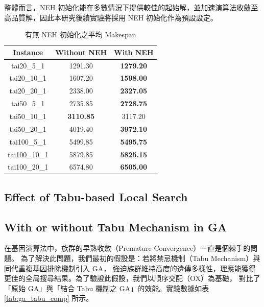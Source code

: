 \documentclass[conference]{IEEEtran}
\begin{document}
整體而言，NEH 初始化能在多數情況下提供較佳的起始解，並加速演算法收斂至高品質解，因此本研究後續實驗將採用 NEH 初始化作為預設設定。
\begin{table}[H]
\centering
\caption{有無 NEH 初始化之平均 Makespan}
\label{tab:neh}
\begin{tabular}{c|c|c}
\hline
Instance & Without NEH & With NEH \\
\hline
tai20\_5\_1   & 1291.30 & \textbf{1279.20} \\
tai20\_10\_1  & 1607.20 & \textbf{1598.00} \\
tai20\_20\_1  & 2338.00 & \textbf{2327.05} \\
tai50\_5\_1   & 2735.85 & \textbf{2728.75} \\
tai50\_10\_1  & \textbf{3110.85} & 3117.20 \\
tai50\_20\_1  & 4019.40 & \textbf{3972.10} \\
tai100\_5\_1  & 5499.85 & \textbf{5495.75} \\
tai100\_10\_1 & 5879.85 & \textbf{5825.15} \\
tai100\_20\_1 & 6574.80 & \textbf{6505.00} \\
\hline
\end{tabular}
\end{table}


\subsection{Effect of Tabu-based Local Search}




\subsection{With or without Tabu Mechanism in GA}

在基因演算法中，族群的早熟收斂（Premature Convergence）一直是個棘手的問題。
為了解決此問題，我們最初的假設是：若將禁忌機制（Tabu Mechanism）與同代重複基因排除機制引入 GA，
強迫族群維持高度的遺傳多樣性，理應能獲得更佳的全局搜尋結果。為了驗證此假設，我們以順序交配（OX）為基礎，
對比了「原始 GA」與「結合 Tabu 機制之 GA」的效能。實驗數據如表 \ref{tab:ga_tabu_comp} 所示。
\end{document}
